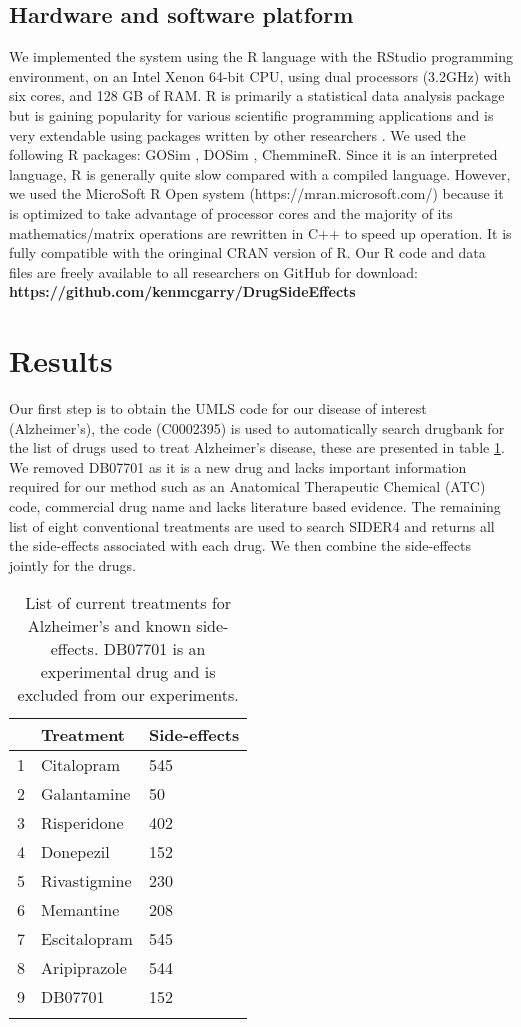 \documentclass[preprint,12pt]{elsarticle}
\begin{document}
\subsection{Hardware and software platform}
We implemented the system using the R language with the RStudio programming environment, on an Intel Xenon 64-bit CPU, using dual processors (3.2GHz) with six cores, and 128 GB of RAM. R is primarily a statistical data analysis package but is gaining popularity for various scientific programming applications and is very extendable using packages written by other researchers \cite{RUser}.  We used the following R packages: GOSim \cite{Yu2015}, DOSim \cite{Yu2010}, ChemmineR\cite{Cao2008}. Since it is an interpreted language, R is generally quite slow compared with a compiled language. However, we used the MicroSoft R Open system (https://mran.microsoft.com/) because it is optimized to take advantage of processor cores and the majority of its mathematics/matrix operations are rewritten in C++ to speed up operation. It is fully compatible with the oringinal CRAN version of R. Our R code and data files are freely available to all researchers on GitHub for download:\\ {\bf https://github.com/kenmcgarry/DrugSideEffects}


\section{Results}
Our first step is to obtain the UMLS code for our disease of interest (Alzheimer's), the code (C0002395) is used to automatically search drugbank for the list of drugs used to treat Alzheimer's disease, these are presented in table \ref{drugs}. We removed DB07701 as it is a new drug and  lacks important information required for our method such as an Anatomical Therapeutic Chemical (ATC) code, commercial drug name and lacks literature based evidence. The remaining list of eight conventional treatments are used to search SIDER4 and returns all the side-effects associated with each drug. We then combine the side-effects jointly for the drugs. 

\begin{table}[h]
\scriptsize
\centering \caption{List of current treatments for Alzheimer's and known side-effects. DB07701 is an experimental drug and is excluded from our experiments.}
\begin{tabular}{lll}
  \hline
\textbf{} & \textbf{Treatment} & \textbf{Side-effects} \\ \hline
1 & Citalopram &545 \\
2 & Galantamine &50 \\
3 & Risperidone& 402 \\
4 & Donepezil & 152 \\
5 & Rivastigmine & 230 \\
6 & Memantine & 208 \\
7 & Escitalopram & 545 \\
8 & Aripiprazole &544 \\
9 & DB07701 &152 \\
   \hline \\
   \end{tabular}
\label{drugs}
\end{table}
\normalsize
\end{document}
